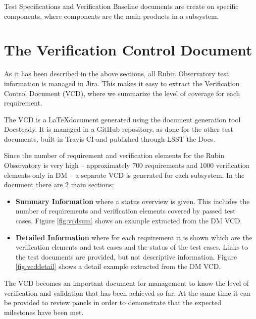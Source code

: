 Test Specifications and Verification Baseline documents are create on specific components, where components are the main products in a subsystem.


\section{The Verification Control Document}

As it has been described in the above sections, all Rubin Observatory test information is managed in Jira. 
This makes it easy to extract the Verification Control Document (VCD), where we summarize the level of coverage for each requirement.

The VCD is a \LaTeX document generated using the document generation tool Docsteady. 
It is managed in a GitHub repository, as done for the other test documents, built in Travis CI and published through LSST the Docs.

Since the number of requirement and verification elements for the Rubin Observatory is very high --
approximately 700 requirements and 1000 verification elements only in DM -- a separate VCD is generated for each subsystem.
In the document there are 2 main sections:

\begin{itemize}
\item \textbf{Summary Information} where a status overview is given. 
This includes the number of requirements and verification elements covered by passed test cases.
Figure \ref{fig:vcdsum} shows an example extracted from the DM VCD.
\item \textbf{Detailed Information} where for each requirement it is shown which are the verification elements and test cases
and the status of the test cases. Links to the test documents are provided, but not descriptive information.
Figure \ref{fig:vcddetail} shows a detail example extracted from the DM VCD.
\end{itemize}

The VCD becomes an important document for management to know the level of verification and validation that has been achieved so far.
At the same time it can be provided to review panels in order to demonstrate that the expected milestones have been met.

